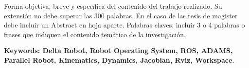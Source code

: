 \thispagestyle{fancy}
\vspace{5mm}
Forma objetiva, breve y específica del contenido del trabajo realizado. Su extensión no debe superar las 300 palabras. 
En el caso de las tesis de magister debe incluir un Abstract en hoja aparte.
Palabras claves: incluir 3 o 4 palabras o frases que indiquen el contenido temático de la investigación.

\vfill
\noindent\textbf{Keywords: Delta Robot, Robot Operating System, ROS, ADAMS, Parallel Robot, Kinematics, Dynamics, Jacobian, Rviz, Workspace.} 